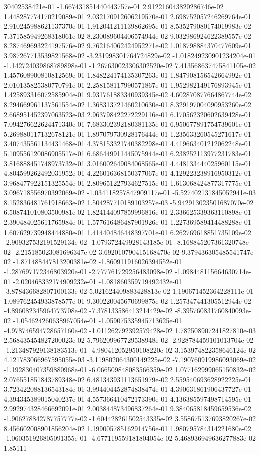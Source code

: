 30402538421e-01	-1.667431851440443757e-01	2.912216043820286746e-02	1.448287774170219089e-01	2.032170912606219570e-01	2.698752057246269764e-01	2.910245988621137370e-01	1.912041211139862695e-01	8.535279080174019983e-02	7.371585949268318061e-02	8.230089604406574944e-02	9.032986924622389557e-02	8.287469693224197576e-02	9.762164062424952271e-02	1.018798884370477609e-01	3.987267713539821568e-02	-3.231998301764724829e-02	-1.018249230901234204e-01	-1.142724039868789898e-01	-1.267630023306302520e-02	7.413568637475841105e-02	1.457608900810812569e-01	1.848224174135307263e-01	1.847908156542664992e-01	2.010135825380770791e-01	2.258158117990571867e-01	1.952982149176893945e-01	1.425893316072585904e-01	9.931761883340939345e-02	4.602870877664867744e-02	8.294669961137561554e-02	1.368313721460210630e-01	8.329197004090953260e-02	2.668951452397063523e-03	2.963798422272229116e-01	6.170562320602639428e-01	7.094276622624471340e-01	7.683302392180381135e-01	6.950677891754739601e-01	5.269880117132678121e-01	1.897079730928176444e-01	1.235633260545271617e-01	3.407435561134431468e-01	4.378153321740382298e-01	4.419663401212062248e-01	5.109556120086905517e-01	6.686449911445075944e-01	6.238252113977231783e-01	3.816888451748973732e-01	3.016002649084068565e-01	4.448133444025960115e-01	4.804599262492031952e-01	4.226016368150377067e-01	4.129223238916950312e-01	3.968477922151325554e-01	2.809651227934627515e-01	1.613068424877317775e-01	3.096718556970392069e-02	-1.034118257847909117e-01	-5.527402131845052941e-03	8.152836481761918663e-02	1.504287710189103257e-03	-5.942913023501687070e-02	6.508741010803500981e-02	1.824144097859996816e-01	2.336625339363110898e-01	2.390484025611765984e-01	1.577616486487901926e-01	1.227369589414488288e-01	1.607629739948444880e-01	1.414404846448397701e-01	6.262769618851735109e-02	-2.909327532191529134e-02	-1.079372449928143185e-01	-8.168845207361320748e-02	-2.215185023081696347e-02	3.692010790415168470e-02	9.379436305485541747e-02	-1.871488447813200381e-02	-1.860911916026394552e-01	-1.287697172346803920e-01	-2.777761729256483098e-02	-1.098448115664630714e-01	-2.020468332174909232e-01	-1.081860359719492432e-01	-3.878436682807100133e-02	5.021624409883428813e-02	1.190671452364228111e-01	1.089762454933878577e-01	9.300220045670699875e-02	1.257347441305512944e-02	-4.896082345964773708e-02	-7.378133586413214429e-02	-8.395760831760840093e-02	-1.054624260638967054e-01	-1.059075335945713625e-01	-4.978746594728657160e-02	-1.011262792392579428e-02	1.782508907241827810e-03	2.568435454827200023e-02	5.796209967729538948e-02	-2.928784459101013704e-02	-1.213487929138183513e-01	-4.980412052950108220e-02	3.153974822358646124e-02	4.121783066967595055e-03	-3.119802064300149225e-02	-7.190760919986093069e-02	-1.192830407359880968e-01	-6.066509848083566359e-02	1.077162999065150832e-02	2.076551851843789348e-02	6.481343931113651979e-02	2.559540693628922225e-01	3.723422088136543184e-01	3.994404452874838474e-01	4.390631861906437727e-01	4.394345389015040237e-01	4.557366410472173390e-01	4.136385597498714595e-01	2.992974328466692091e-01	2.003844873496837264e-01	9.384065818459659536e-02	-1.906278842787757777e-02	-1.604428261502543335e-02	3.558675137693820267e-02	8.456602008901856204e-02	1.199005785162914756e-01	1.980795784314221680e-02	-1.060351926805091355e-01	-4.677119559181804054e-02	5.468936949636277883e-02	1.85111